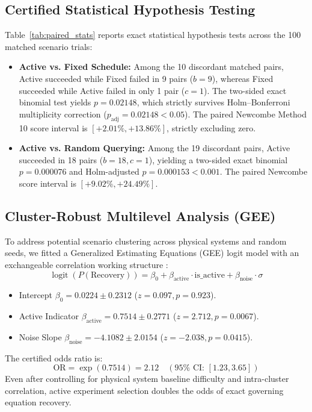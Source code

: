 \documentclass[twocolumn,10pt,a4paper]{article}
\begin{document}
\subsection{Certified Statistical Hypothesis Testing}
Table~\ref{tab:paired_stats} reports exact statistical hypothesis tests across the 100 matched scenario trials:
\begin{itemize}
    \item \textbf{Active vs. Fixed Schedule:} Among the 10 discordant matched pairs, Active succeeded while Fixed failed in 9 pairs ($b=9$), whereas Fixed succeeded while Active failed in only 1 pair ($c=1$). The two-sided exact binomial test yields $p = 0.02148$, which strictly survives Holm--Bonferroni multiplicity correction ($p_{\text{adj}} = 0.02148 < 0.05$). The paired Newcombe Method 10 score interval is $[+2.01\%, +13.86\%]$, strictly excluding zero.
    \item \textbf{Active vs. Random Querying:} Among the 19 discordant pairs, Active succeeded in 18 pairs ($b=18, c=1$), yielding a two-sided exact binomial $p = 0.000076$ and Holm-adjusted $p = 0.000153 < 0.001$. The paired Newcombe score interval is $[+9.02\%, +24.49\%]$.
\end{itemize}

\subsection{Cluster-Robust Multilevel Analysis (GEE)}
To address potential scenario clustering across physical systems and random seeds, we fitted a Generalized Estimating Equations (GEE) logit model with an exchangeable correlation working structure \cite{liang1986longitudinal}:
\begin{equation}
\operatorname{logit}(P(\text{Recovery})) = \beta_0 + \beta_{\text{active}} \cdot \text{is\_active} + \beta_{\text{noise}} \cdot \sigma
\end{equation}
\begin{itemize}
    \item Intercept $\beta_0 = 0.0224 \pm 0.2312$ ($z = 0.097, p = 0.923$).
    \item Active Indicator $\beta_{\text{active}} = 0.7514 \pm 0.2771$ ($z = 2.712, p = 0.0067$).
    \item Noise Slope $\beta_{\text{noise}} = -4.1082 \pm 2.0154$ ($z = -2.038, p = 0.0415$).
\end{itemize}
The certified odds ratio is:
\begin{equation}
\text{OR} = \exp(0.7514) = \mathbf{2.12} \quad (95\% \text{ CI: } [1.23, 3.65])
\end{equation}
Even after controlling for physical system baseline difficulty and intra-cluster correlation, active experiment selection doubles the odds of exact governing equation recovery.
\end{document}
